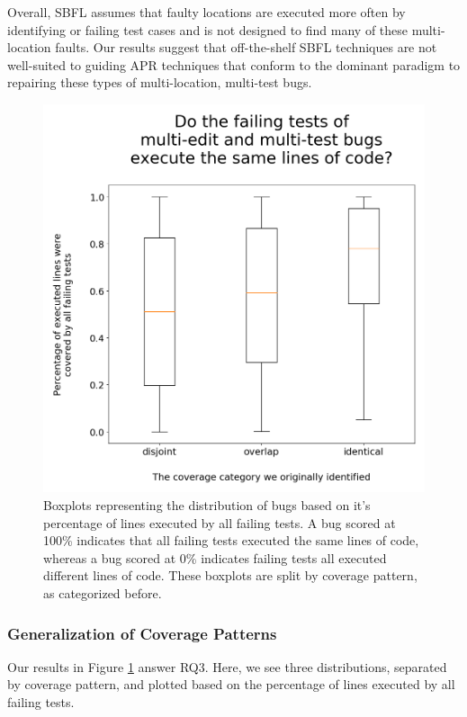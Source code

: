\documentclass[10pt, conference]{IEEEtran}
\begin{document}
Overall, SBFL assumes that faulty locations are executed more often by identifying 
or failing test cases and is not designed to find many of these multi-location
faults. Our results suggest that off-the-shelf SBFL techniques are not
well-suited to guiding APR techniques that conform to the dominant paradigm to repairing
these types of multi-location, multi-test bugs.

\begin{figure}
	\includegraphics[width=.9\linewidth,left]{img/coverage-buggy.png}
	\caption{Boxplots representing the distribution of bugs based on it's percentage of lines 
	executed 
	by all failing tests. A bug scored at 100\% indicates that all failing tests executed the same 
	lines of 
	code, whereas a bug scored at 0\% indicates failing tests all executed different lines of 
	code. 
	These boxplots are split by coverage pattern, as categorized before.}
	\label{fig:coverage-buggy}
\end{figure}

\subsubsection{Generalization of Coverage Patterns}

Our results in Figure \ref{fig:coverage-buggy} answer RQ3. Here, we see three distributions, 
separated by coverage pattern, and plotted based on the percentage of lines executed by all 
failing tests. 
\end{document}
